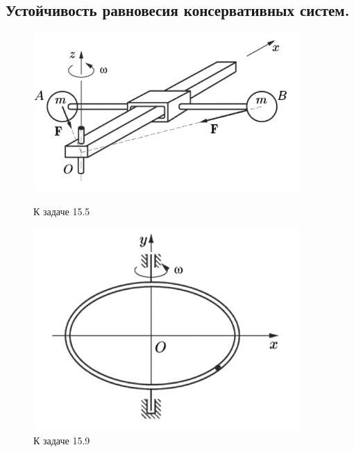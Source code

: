 \subsection{Устойчивость равновесия консервативных систем.}


\begin{figure}
\begin{minipage}[t]{0.36\textwidth}
    \centering
    \includegraphics[width=0.9\textwidth]{figures/15_5.png}
    \caption{К задаче 15.5}
\end{minipage}
\hfill
\begin{minipage}[t]{0.36\textwidth}
    \centering
    \includegraphics[width=0.9\textwidth]{figures/15_9.png}
    \caption{К задаче 15.9}
\end{minipage}
\hfill
\begin{minipage}[t]{0.2\textwidth}
    \centering

\end{minipage}
\end{figure}
